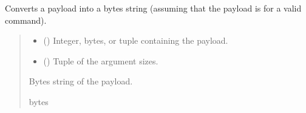 \documentclass[letterpaper,10pt,english]{sphinxmanual}
\begin{document}
\begin{fulllineitems}

\begin{fulllineitems}
\label{\detokenize{Morelia.Devices:Morelia.Devices.BasicPodProtocol.Pod.PayloadToBytes}}
\pysigstartsignatures
{}
\pysigstopsignatures
\sphinxAtStartPar
Converts a payload into a bytes string (assuming that the payload is for a valid command).
\begin{quote}\begin{description}
\begin{itemize}
\item {} 
\sphinxAtStartPar
{} (\sphinxstyleliteralemphasis{\sphinxupquote{ | }}\sphinxstyleliteralemphasis{\sphinxupquote{ | }}\sphinxstyleliteralemphasis{\sphinxupquote{{[}}}\sphinxstyleliteralemphasis{\sphinxupquote{ | }}\sphinxstyleliteralemphasis{\sphinxupquote{{]}}}) \textendash{} Integer, bytes, or tuple containing the payload.

\item {} 
\sphinxAtStartPar
{} (\sphinxstyleliteralemphasis{\sphinxupquote{{[}}}\sphinxstyleliteralemphasis{\sphinxupquote{{]}}}) \textendash{} Tuple of the argument sizes.

\end{itemize}

\sphinxAtStartPar
Bytes string of the payload.

\sphinxAtStartPar
bytes


\end{description}
\end{quote}
\end{fulllineitems}
\end{fulllineitems}
\end{document}
